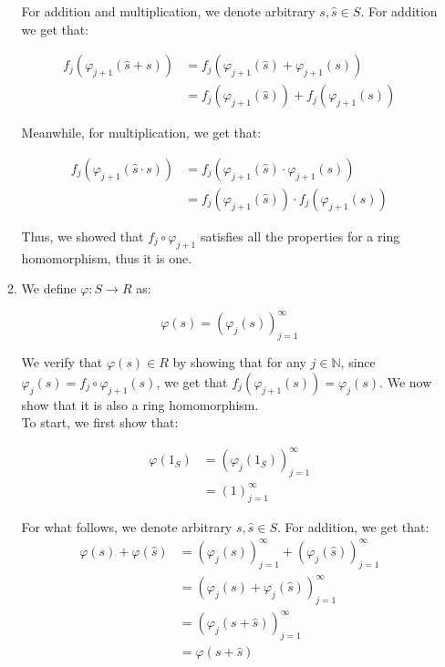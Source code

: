 \documentclass{article}
\begin{document}
\begin{enumerate}
\begin{enumerate}
        For addition and multiplication, we denote arbitrary $s, \hat{s} \in S$. For addition we get that: 

        \begin{align*}
            f_j(\varphi_{j+1}(\hat{s} + s)) &= f_j(\varphi_{j+1}(\hat{s}) + \varphi_{j+1}(s))\\
            &= f_j(\varphi_{j+1}(\hat{s})) + f_j(\varphi_{j+1}(s))
        \end{align*}

        Meanwhile, for multiplication, we get that: 

        \begin{align*}
            f_j(\varphi_{j+1}(\hat{s} \cdot s)) &= f_j(\varphi_{j+1}(\hat{s}) \cdot \varphi_{j+1}(s))\\
            &= f_j(\varphi_{j+1}(\hat{s})) \cdot f_j(\varphi_{j+1}(s))
        \end{align*}

        Thus, we showed that $f_j \circ \varphi_{j+1}$ satisfies all the properties for a ring homomorphism, thus it is one. \\

        \item 
        We define $\varphi:S \rightarrow R$ as: 

        $$\varphi(s) = (\varphi_j(s))^{\infty}_{j=1}$$

        We verify that $\varphi(s) \in R$ by showing that for any $j \in \mathbb{N}$, since $\varphi_j(s) = f_j\circ\varphi_{j+1}(s)$, we get that $f_j(\varphi_{j+1}(s)) = \varphi_j(s)$. We now show that it is also a ring homomorphism. \\
        
        To start, we first show that: 

        \begin{align*}
            \varphi(1_S) &= (\varphi_j(1_S))^{\infty}_{j=1} \\
            &= (1)^{\infty}_{j=1}
        \end{align*}

        For what follows, we denote arbitrary $s, \hat{s} \in S$. For addition, we get that: 
        \begin{align*}
            \varphi(s) + \varphi(\hat{s}) &= (\varphi_j(s))^{\infty}_{j=1} + (\varphi_j(\hat{s}))^{\infty}_{j=1}\\
            &= (\varphi_j(s) + \varphi_j(\hat{s}))^{\infty}_{j=1} \\
            &= (\varphi_j(s + \hat{s}))^{\infty}_{j=1}  \\
            &= \varphi(s + \hat{s})
        \end{align*}


\end{enumerate}
\end{enumerate}
\end{document}
